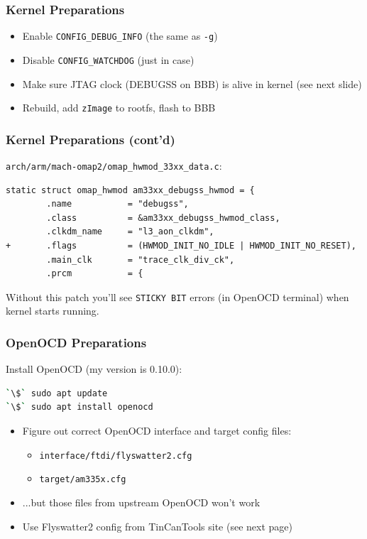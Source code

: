 \documentclass[aspectratio=169,usenames,dvipsnames]{beamer}
\newcounter{cont}
\begin{document}
\begin{frame}
  \frametitle{Kernel Preparations}
  \begin{itemize}
    \item Enable \texttt{CONFIG\_DEBUG\_INFO} (the same as \texttt{-g})
    \item Disable \texttt{CONFIG\_WATCHDOG} (just in case)
    \item Make sure JTAG clock (DEBUGSS on BBB) is alive in kernel
          (see next slide)
    \item Rebuild, add \texttt{zImage} to rootfs, flash to BBB
  \end{itemize}
\end{frame}

\begin{frame}[containsverbatim]
  \frametitle{Kernel Preparations (cont'd)}
  \texttt{arch/arm/mach-omap2/omap\_hwmod\_33xx\_data.c}:
  \begin{lstlisting}
static struct omap_hwmod am33xx_debugss_hwmod = {
        .name           = "debugss",
        .class          = &am33xx_debugss_hwmod_class,
        .clkdm_name     = "l3_aon_clkdm",
+       .flags          = (HWMOD_INIT_NO_IDLE | HWMOD_INIT_NO_RESET),
        .main_clk       = "trace_clk_div_ck",
        .prcm           = {
  \end{lstlisting}
  Without this patch you'll see \texttt{STICKY BIT} errors (in OpenOCD terminal)
  when kernel starts running.
\end{frame}

\begin{frame}[containsverbatim]
  \frametitle{OpenOCD Preparations}
  Install OpenOCD (my version is 0.10.0):
  \begin{lstlisting}[language=bash]
`\$` sudo apt update
`\$` sudo apt install openocd
  \end{lstlisting}

  \begin{itemize}
    \item Figure out correct OpenOCD interface and target config files:\\
      \begin{itemize}
        \item \texttt{interface/ftdi/flyswatter2.cfg}
        \item \texttt{target/am335x.cfg}
      \end{itemize}
    \item ...but those files from upstream OpenOCD won't work
    \item Use Flyswatter2 config from TinCanTools site (see next page)
  \end{itemize}
\end{frame}
\end{document}
